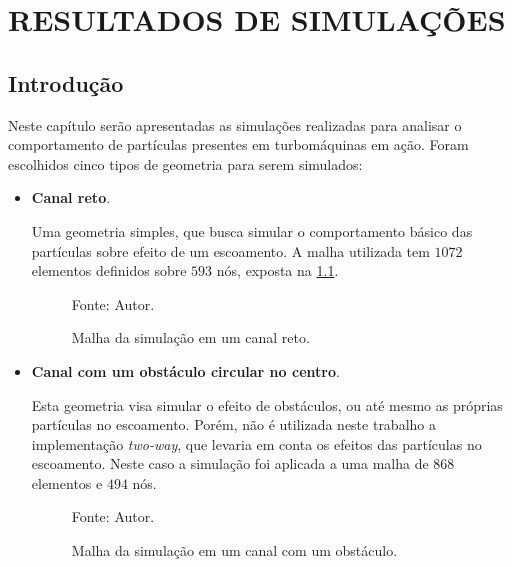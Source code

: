 \chapter{RESULTADOS DE SIMULAÇÕES}
\label{resultados}
\section{\textbf{Introdução}}
Neste capítulo serão apresentadas as simulações realizadas para analisar o comportamento de partículas presentes em turbomáquinas em ação.
Foram escolhidos cinco tipos de geometria para serem simulados:
\begin{itemize}
    \item \textbf{Canal reto}.

        Uma geometria simples, que busca simular o comportamento básico das partículas sobre efeito de um escoamento. 
        A malha utilizada tem $1072$ elementos definidos sobre $593$ nós, exposta na \ref{channel_mesh}.
        \begin{figure}[H]
            \centering
             {\raggedleft \scriptsize Fonte: Autor.}
            \caption{Malha da simulação em um canal reto.}
            \label{channel_mesh}
        \end{figure}

    \item \textbf{Canal com um obstáculo circular no centro}.

        Esta geometria visa simular o efeito de obstáculos, ou até mesmo as próprias partículas no escoamento.
        Porém, não é utilizada neste trabalho a implementação \textit{two-way}, que levaria em conta os efeitos das partículas no escoamento.
        Neste caso a simulação foi aplicada a uma malha de $868$ elementos e $494$ nós.
        \begin{figure}[H]
            \centering
             {\raggedleft \scriptsize Fonte: Autor.}
            \caption{Malha da simulação em um canal com um obstáculo.}
            \label{obstacle_mesh}
        \end{figure}


\end{itemize}
